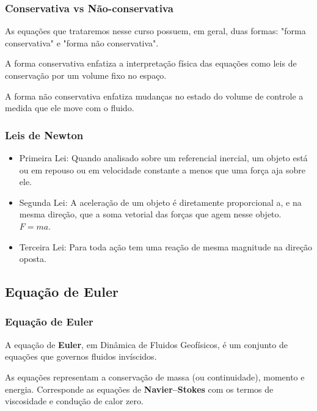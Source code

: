 \begin{frame}
\frametitle{Conservativa vs Não-conservativa}
  \begin{block}{}
    As equações que trataremos nesse curso possuem, em geral, duas formas:
    "forma conservativa" e "forma não conservativa".
  \end{block}

  \begin{block}{}
    A forma conservativa enfatiza a interpretação física das equações como leis
    de conservação por um volume fixo no espaço.

    A forma não conservativa enfatiza mudanças no estado do volume de controle
    a medida que ele move com o fluido.
  \end{block}
\end{frame}

\begin{frame}
\frametitle{Leis de Newton}
  \begin{itemize}[<+-| alert@+>]
    \item Primeira Lei: Quando analisado sobre um referencial inercial, um
    objeto está ou em repouso ou em velocidade constante a menos que uma força
    aja sobre ele.

    \item Segunda Lei: A aceleração de um objeto é diretamente proporcional a,
    e na mesma direção, que a soma vetorial das forças que agem nesse objeto.
    $F = ma$.

    \item Terceira Lei: Para toda ação tem uma reação de mesma magnitude na
    direção oposta.
  \end{itemize}
\end{frame}

\subsection{Equação de Euler}
\begin{frame}
\frametitle{Equação de Euler}
  \begin{block}{}
    A equação de {\bf Euler}, em Dinâmica de Fluidos Geofísicos, é um conjunto de
    equações  que governos fluidos invíscidos.
  \end{block}

  \begin{block}{}
    As equações representam a conservação de massa (ou continuidade), momento
    e energia.  Corresponde as equações de {\bf Navier–Stokes} com os termos de
    viscosidade e condução de calor zero.
  \end{block}
\end{frame}

